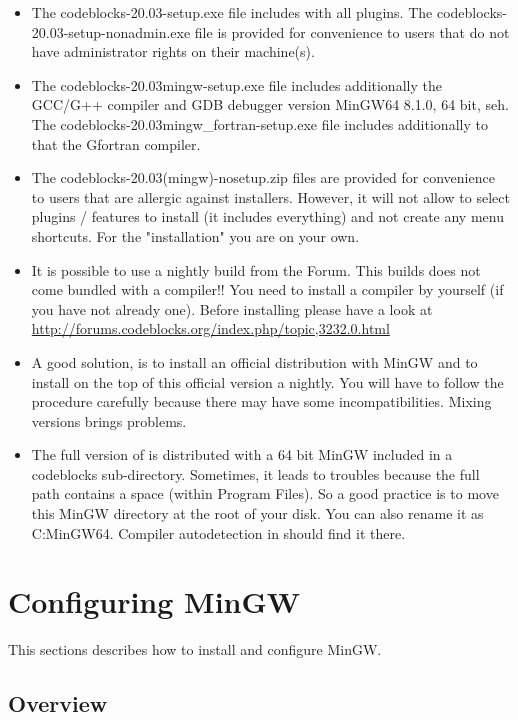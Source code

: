 \begin{itemize}
\item The codeblocks-20.03-setup.exe file includes \codeblocks with all plugins. The codeblocks-20.03-setup-nonadmin.exe file is provided for convenience to users that do not have administrator rights on their machine(s).
\item The codeblocks-20.03mingw-setup.exe file includes additionally the GCC/G++ compiler and GDB debugger version MinGW64 8.1.0, 64 bit, seh. The codeblocks-20.03mingw\_fortran-setup.exe file includes additionally to that the Gfortran compiler.
\item The codeblocks-20.03(mingw)-nosetup.zip files are provided for convenience to users that are allergic against installers. However, it will not allow to select plugins / features to install (it includes everything) and not create any menu shortcuts. For the "installation" you are on your own.
\item It is possible to use a nightly build from the Forum. This builds does not come bundled with a compiler!! You need to install a compiler by yourself (if you have not already one). Before installing please have a look at \url{http://forums.codeblocks.org/index.php/topic,3232.0.html} 
\item A good solution, is to install an official distribution with MinGW and to install on the top of this official version a nightly. You will have to follow the procedure carefully because there may have some incompatibilities. Mixing versions brings problems. 
\item The full version of \codeblocks is distributed with a 64 bit MinGW included in a codeblocks sub-directory. Sometimes, it leads to troubles because the full path contains a space (within Program Files). So a good practice is to move this MinGW directory at the root of your disk. You can also rename it as C:\osp MinGW64. Compiler autodetection in \codeblocks should find it there.
\end{itemize}

\section{Configuring MinGW}

This sections describes how to install and configure MinGW.

\subsection{Overview}

